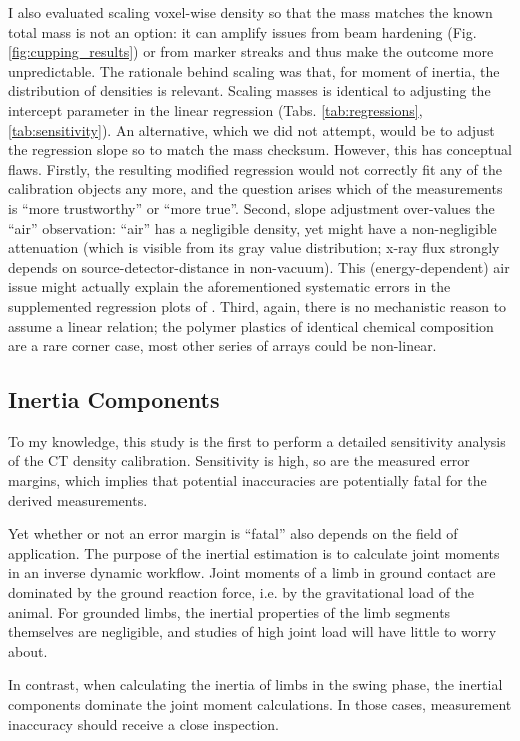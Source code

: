 I also evaluated scaling voxel-wise density so that the mass matches the known total mass is not an option: it can amplify issues from beam hardening (Fig. \ref{fig:cupping_results}) or from marker streaks and thus make the outcome more unpredictable.
The rationale behind scaling was that, for moment of inertia, the distribution of densities is relevant.
Scaling masses is identical to adjusting the intercept parameter in the linear regression (Tabs. \ref{tab:regressions}, \ref{tab:sensitivity}).
An alternative, which we did not attempt, would be to adjust the regression slope so to match the mass checksum.
However, this has conceptual flaws.
Firstly, the resulting modified regression would not correctly fit any of the calibration objects any more, and the question arises which of the measurements is ``more trustworthy'' or ``more true''.
Second, slope adjustment over-values the ``air'' observation: ``air'' has a negligible density, yet might have a non-negligible attenuation (which is visible from its gray value distribution; x-ray flux strongly depends on source-detector-distance in non-vacuum).
This (energy-dependent) air issue might actually explain the aforementioned systematic errors in the supplemented regression plots of \citet{Durston2022}.
Third, again, there is no mechanistic reason to assume a linear relation; the polymer plastics of identical chemical composition are a rare corner case, most other series of arrays could be non-linear.


\subsection{Inertia Components}
\label{sec:org085fe0d}
To my knowledge, this study is the first to perform a detailed sensitivity analysis of the CT density calibration.
Sensitivity is high, so are the measured error margins, which implies that potential inaccuracies are potentially fatal for the derived measurements.

Yet whether or not an error margin is ``fatal'' also depends on the field of application.
The purpose of the inertial estimation is to calculate joint moments in an inverse dynamic workflow.
Joint moments of a limb in ground contact are dominated by the ground reaction force, i.e. by the gravitational load of the animal.
For grounded limbs, the inertial properties of the limb segments themselves are negligible, and studies of high joint load will have little to worry about.

In contrast, when calculating the inertia of limbs in the swing phase, the inertial components dominate the joint moment calculations.
In those cases, measurement inaccuracy should receive a close inspection.


